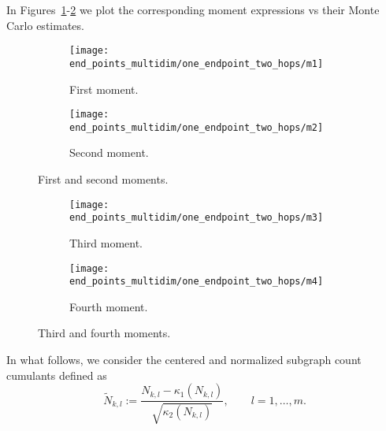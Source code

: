 \documentclass[12pt]{article}
\numberwithin{equation}{section}
\begin{document}
\vspace{-0.6cm}

\noindent
 In Figures~\ref{fig1-11}-\ref{fig2-11} we plot the corresponding
moment expressions vs their Monte Carlo estimates. 
\begin{figure}[H]
  \centering
 \begin{subfigure}[b]{0.49\textwidth}
    \texttt{[image: end\_points\_multidim/one\_endpoint\_two\_hops/m1]} 
    \caption{First moment.} 
 \end{subfigure}
 \begin{subfigure}[b]{0.49\textwidth}
    \texttt{[image: end\_points\_multidim/one\_endpoint\_two\_hops/m2]} 
    \caption{Second moment.} 
 \end{subfigure}
  \caption{First and second moments.} 
\label{fig1-11} 
\end{figure}
\vskip-0.4cm 
\begin{figure}[H]
  \centering
 \begin{subfigure}[b]{0.49\textwidth}
    \texttt{[image: end\_points\_multidim/one\_endpoint\_two\_hops/m3]} 
    \caption{Third moment.} 
 \end{subfigure}
 \begin{subfigure}[b]{0.49\textwidth}
    \texttt{[image: end\_points\_multidim/one\_endpoint\_two\_hops/m4]} 
    \caption{Fourth moment.} 
 \end{subfigure}
  \caption{Third and fourth moments.} 
\label{fig2-11} 
\end{figure}
\noindent
 In what follows, we consider the centered and normalized subgraph count cumulants defined as 
$$
 \widetilde{N}_{k,l}:= \frac{N_{k,l} - \kappa_1 (N_{k,l})}{\sqrt{\kappa_2(N_{k,l})}}, \qquad l=1,\ldots , m. 
$$
 
\end{document}
